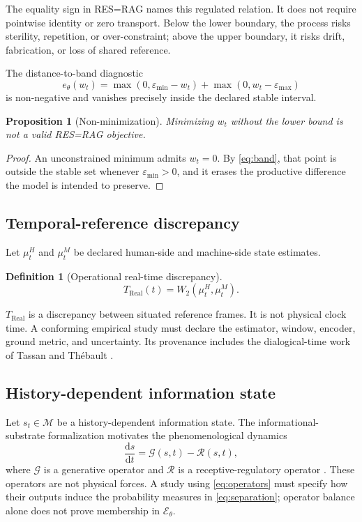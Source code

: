 \documentclass[11pt]{article}
\newcommand{\Wtwo}{W_2}
\newcommand{\Eband}{\mathcal E_{\theta}}
\newtheorem{definition}{Definition}
\newtheorem{proposition}{Proposition}
\begin{document}
The equality sign in RES=RAG names this regulated relation. It does not require
pointwise identity or zero transport. Below the lower boundary, the process
risks sterility, repetition, or over-constraint; above the upper boundary, it
risks drift, fabrication, or loss of shared reference.

The distance-to-band diagnostic
\begin{equation}
e_\theta(w_t)=
\max(0,\varepsilon_{\min}-w_t)
+
\max(0,w_t-\varepsilon_{\max})
\label{eq:bandpenalty}
\end{equation}
is non-negative and vanishes precisely inside the declared stable interval.

\begin{proposition}[Non-minimization]
Minimizing $w_t$ without the lower bound is not a valid RES=RAG objective.
\end{proposition}

\begin{proof}
An unconstrained minimum admits $w_t=0$. By \cref{eq:band}, that point is
outside the stable set whenever $\varepsilon_{\min}>0$, and it erases the
productive difference the model is intended to preserve.
\end{proof}

\subsection{Temporal-reference discrepancy}

Let $\mu_t^H$ and $\mu_t^M$ be declared human-side and machine-side state
estimates.
\begin{definition}[Operational real-time discrepancy]
\begin{equation}
T_{\mathrm{Real}}(t)=\Wtwo(\mu_t^H,\mu_t^M).
\label{eq:treal}
\end{equation}
\end{definition}
$T_{\mathrm{Real}}$ is a discrepancy between situated reference frames. It is
not physical clock time. A conforming empirical study must declare the
estimator, window, encoder, ground metric, and uncertainty. Its provenance
includes the dialogical-time work of Tassan and Thébault
\citep{tassan-thebault-treal}.

\subsection{History-dependent information state}

Let $s_t\in\mathcal M$ be a history-dependent information state. The
informational-substrate formalization motivates the phenomenological dynamics
\begin{equation}
\frac{\mathrm ds}{\mathrm dt}
=
\mathcal G(s,t)-\mathcal R(s,t),
\label{eq:operators}
\end{equation}
where $\mathcal G$ is a generative operator and $\mathcal R$ is a
receptive-regulatory operator \citep{slade-tassan-substrate}. These operators
are not physical forces. A study using \cref{eq:operators} must specify how
their outputs induce the probability measures in \cref{eq:separation};
operator balance alone does not prove membership in \(\Eband\).
\end{document}
